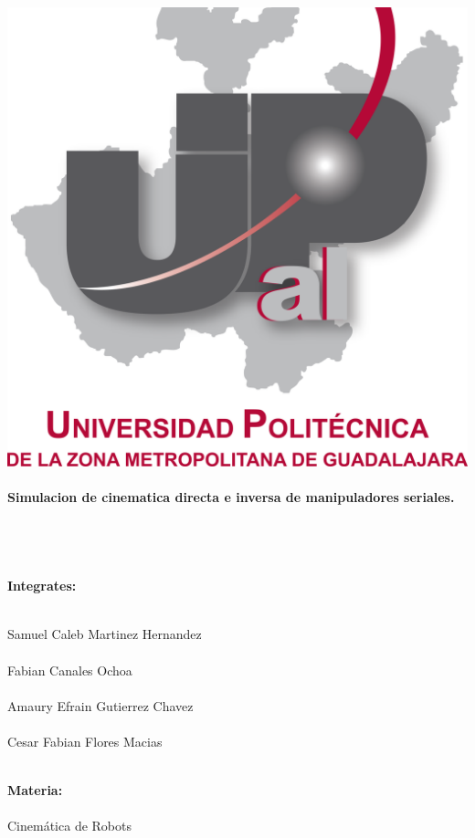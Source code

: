 \documentclass[10pt,a4paper]{article}
\begin{document}
\begin{center}
\includegraphics[scale=0.2]{imagenes/upzmg.png} 
\end{center}
\paragraph{\Huge Simulacion de cinematica directa e inversa de manipuladores seriales.} \textbf{\Huge \\ \\ \\Integrates:} \\ \\
	\begin{Large}
		Samuel Caleb Martinez Hernandez\\ \\
		Fabian Canales Ochoa\\ \\
		Amaury Efrain Gutierrez Chavez\\ \\
		Cesar Fabian Flores Macias\\ \\
		\end{Large}
		\textbf{\Huge Materia:}\\ \\
		{\Large Cinemática de Robots}\\ \\
\end{document}
